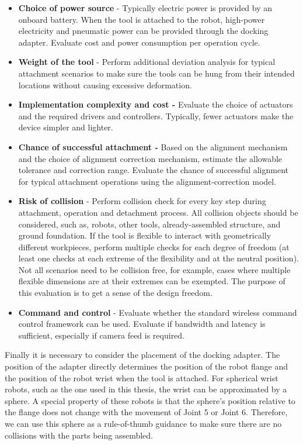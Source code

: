 \documentclass[11pt]{book}
\begin{document}
\begin{itemize}
	\item \textbf{Choice of power source} - Typically electric power is provided by an onboard battery. When the tool is attached to the robot, high-power electricity and pneumatic power can be provided through the docking adapter. Evaluate cost and power consumption per operation cycle.

	\item \textbf{Weight of the tool }- Perform additional deviation analysis for typical attachment scenarios to make sure the tools can be hung from their intended locations without causing excessive deformation.

	\item \textbf{Implementation complexity and cost - }Evaluate the choice of actuators and the required drivers and controllers. Typically, fewer actuators make the device simpler and lighter.

	\item \textbf{Chance of successful attachment - }Based on the alignment mechanism and the choice of alignment correction mechanism, estimate the allowable tolerance and correction range. Evaluate the chance of successful alignment for typical attachment operations using the alignment-correction model. 

	\item \textbf{Risk of collision} - Perform collision check for every key step during attachment, operation and detachment process. All collision objects should be considered, such as, robots, other tools, already-assembled structure, and ground foundation. If the tool is flexible to interact with geometrically different workpieces, perform multiple checks for each degree of freedom (at least one checks at each extreme of the flexibility and at the neutral position). Not all scenarios need to be collision free, for example, cases where multiple flexible dimensions are at their extremes can be exempted. The purpose of this evaluation is to get a sense of the design freedom. 

	\item \textbf{Command and control }- Evaluate whether the standard wireless command control framework can be used. Evaluate if bandwidth and latency is sufficient, especially if camera feed is required.

\end{itemize}
Finally it is necessary to consider the placement of the docking adapter. The position of the adapter directly determines the position of the robot flange and the position of the robot wrist when the tool is attached. For spherical wrist robots, such as the one used in this thesis, the wrist can be approximated by a sphere. A special property of these robots is that the sphere’s position relative to the flange does not change with the movement of Joint 5 or Joint 6. Therefore, we can use this sphere as a rule-of-thumb guidance to make sure there are no collisions with the parts being assembled.
\end{document}
